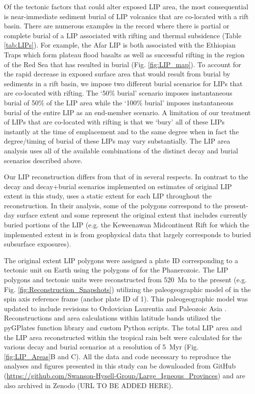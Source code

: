 \documentclass[11pt,letterpaper]{article}
\begin{document}
Of the tectonic factors that could alter exposed LIP area, the most consequential is near-immediate sediment burial of LIP volcanics that are co-located with a rift basin. There are numerous examples in the record where there is partial or complete burial of a LIP associated with rifting and thermal subsidence (Table \ref{tab:LIPs}). For example, the Afar LIP is both associated with the Ethiopian Traps which form plateau flood basalts as well as successful rifting in the region of the Red Sea that has resulted in burial (Fig. \ref{fig:LIP_map}). To account for the rapid decrease in exposed surface area that would result from burial by sediments in a rift basin, we impose two different burial scenarios for LIPs that are co-located with rifting. The `50\% burial' scenario imposes instantaneous burial of 50$\%$ of the LIP area while the `100\% burial' imposes instantaneous burial of the entire LIP as an end-member scenario. A limitation of our treatment of LIPs that are co-located with rifting is that we `bury' all of these LIPs instantly at the time of emplacement and to the same degree when in fact the degree/timing of burial of these LIPs may vary substantially. The LIP area analysis uses all of the available combinations of the distinct decay and burial scenarios described above. 

Our LIP reconstruction differs from that of \citet{Johansson2018a} in several respects. In contrast to the decay and decay+burial scenarios implemented on estimates of original LIP extent in this study, \citet{Johansson2018a} uses a static extent for each LIP throughout the reconstruction. In their analysis, some of the polygons correspond to the present-day surface extent and some represent the original extent that includes currently buried portions of the LIP (e.g. the Keweenawan Midcontinent Rift for which the implemented extent in \citealp{Johansson2018a} is from geophysical data that largely corresponds to buried subsurface exposures).

The original extent LIP polygons were assigned a plate ID corresponding to a tectonic unit on Earth using the polygons of \citet{Torsvik2016a} for the Phanerozoic. The LIP polygons and tectonic units were reconstructed from 520~Ma to the present (e.g. Fig. \ref{fig:Reconstruction_Snapshots}) utilizing the paleogeographic model of \citet{Torsvik2016a} in the spin axis reference frame (anchor plate ID of 1). This paleogeographic model was updated to include revisions to Ordovician Laurentia \citep{Swanson-Hysell2017a} and Paleozoic Asia \citep{Domeier2018a}. Reconstructions and area calculations within latitude bands utilized the pyGPlates function library and custom Python scripts. The total LIP area and the LIP area reconstructed within the tropical rain belt were calculated for the various decay and burial scenarios at a resolution of 5~Myr (Fig. \ref{fig:LIP_Areas}B and C). All the data and code necessary to reproduce the analyses and figures presented in this study can be downloaded from GitHub (\url{https://github.com/Swanson-Hysell-Group/Large_Igneous_Provinces}) and are also archived in Zenodo (URL TO BE ADDED HERE).
\end{document}
